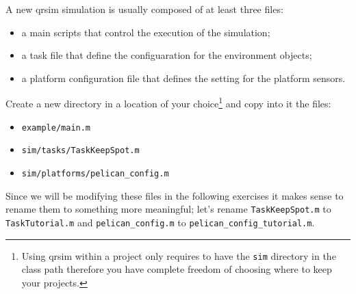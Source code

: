 \documentclass[a4paper,11pt]{article}
\begin{document}
A new qrsim simulation is usually composed of at least three files:
\begin{itemize}
 \item a main scripts that control the execution of the simulation;
 \item a task file that define the configuaration for the environment objects;
 \item a platform configuration file that defines the setting for the platform sensors.
\end{itemize}
Create a new directory in a location of your choice\footnote{Using qrsim within a project only requires to have the \texttt{sim} directory in the class path therefore you have complete freedom of choosing where to keep your projects.} and copy into it the files:
\begin{itemize}
 \item \texttt{example/main.m}
 \item \texttt{sim/tasks/TaskKeepSpot.m}
 \item \texttt{sim/platforms/pelican\_config.m}
\end{itemize}
Since we will be modifying these files in the following exercises it makes sense to rename them to something more meaningful; let's rename \texttt{TaskKeepSpot.m} to \texttt{TaskTutorial.m} and \texttt{pelican\_config.m} to \texttt{pelican\_config\_tutorial.m}.
\end{document}

